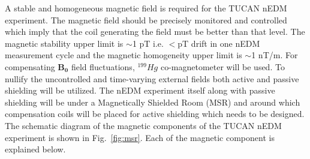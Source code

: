 A stable and homogeneous magnetic field is required for the TUCAN nEDM experiment. The magnetic field should be precisely monitored and controlled which imply that the coil generating the field must be better than that level. The magnetic stability upper limit is $\sim$1 pT i.e. $<$pT drift in one nEDM measurement cycle and the magnetic homogeneity upper limit is $\sim$1 nT/m. For compensating $\bm{B_0}$ field fluctuations,  $^{199}Hg$ co-magnetometer will be used. To nullify the uncontrolled and time-varying external fields both active and passive shielding will be utilized. The nEDM experiment itself along with passive shielding will be under a Magnetically Shielded Room (MSR) and around which compensation coils will be placed for active shielding which needs to be designed. The schematic diagram of the magnetic components of the
TUCAN nEDM experiment is shown in Fig.~\ref{fig:msr}. Each of the magnetic component is explained below. 


 




